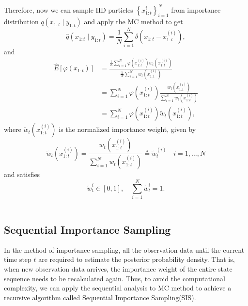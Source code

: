 \documentclass[mstat,12pt]{unswthesis}  %
\numberwithin{equation}{section}
\begin{document}
\noindent Therefore, now we can sample 
IID particles $\left\{x_{1:t}^{i}\right\}_{i=1}^{N}$
from importance distribution 
$q\left(x_{1:t} \mid y_{1:t}\right)$ and apply the MC method
to get
\begin{equation}\hat{q}\left(x_{1:t} \mid y_{1:t}\right)=\frac{1}{N} \sum_{i=1}^{N} \delta\left(x_{1:t}-x_{1:t}^{\left(i\right)}\right),\end{equation}
and 
\begin{equation}\begin{aligned}
 \hat{E}\left[\varphi\left(x_{1: t}\right)\right]&=\frac{\frac{1}{N} \sum_{i=1}^{N} \varphi\left(x_{1: t}^{(i)}\right) w_{t}\left(x_{1: t}^{(i)}\right)}{\frac{1}{N} \sum_{i=1}^{N} w_{t}\left(x_{1: t}^{(i)}\right)}  \\
 &=\sum_{i=1}^{N} \varphi\left(x_{1: t}^{(i)}\right)
 \frac{w_{t}\left(x_{1: t}^{(i)}\right)}{ \sum_{i=1}^{N} w_{t}\left(x_{1: t}^{(i)}\right)}\\
 &=\sum_{i=1}^{N} \varphi\left(x_{1:t}^{(i)}\right) \tilde{w}_{t}\left(x_{1:t}^{(i)}\right),
\end{aligned}\end{equation}
where $\tilde{w}_{t}\left(x_{1:t}^{(i)}\right)$ is the normalized importance weight, given by
\begin{equation}\label{nweight}\widetilde{w}_{t}\left(x_{1:t}^{(i)}\right)
=\frac{w_{t}\left(x_{1: t}^{(i)}\right)}{ \sum_{i=1}^{N} w_{t}\left(x_{1: t}^{(i)}\right)}
\triangleq \widetilde{w}_{t}^{(i)} \quad i=1, \ldots, N\end{equation}
and satisfies
\begin{equation}\tilde{w}_{t}^{i} \in[0,1],
\quad \sum_{i=1}^{N} \tilde{w}_{t}^{i}=1.
\end{equation}\\

\subsection{Sequential Importance Sampling}
In the method of importance sampling, all the observation data until the current time step $t$  are required to  estimate the posterior probability density.  
That is, when new observation data arrives, the importance weight of the entire state sequence needs to be recalculated again.
Thus, to avoid the computational complexity, we can
apply the sequential analysis to MC method to achieve a
recursive algorithm called Sequential Importance Sampling(SIS).\\
\end{document}
